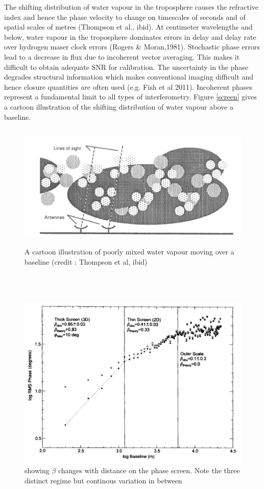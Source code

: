 The shifting distribution of water vapour in the troposphere causes the refractive index and hence the phase velocity to change on timescales of seconds and of spatial scales of metres (Thompson et al., ibid).  At centimeter wavelengths and below, water vapour in the troposphere dominates errors in delay and delay rate over hydrogen maser clock errors (Rogers \& Moran,1981). Stochastic phase errors lead to a decrease in flux due to incoherent vector averaging. This makes it difficult to obtain adequate SNR for calibration. The uncertainty in the phase degrades structural information which makes conventional imaging difficult and hence closure quantities are often used (e.g. Fish et al 2011). Incoherent phases represent a fundamental limit to all types of interferometry. 
Figure \ref{screen} gives a cartoon illustration of the shifting distribution of water vapour above a baseline. 
\begin{figure}[h!]
\centering
    \includegraphics[height=60mm,width=120mm]{Images/screen}
    \caption{A cartoon illustration of poorly mixed water vapour moving over a baseline (credit : Thompson et al, ibid) \label{phase:screen}}
\end{figure}
\\
~\\


\begin{figure}[h!]
\centering
    \includegraphics[scale=0.2]{Images/screentransition}
    \caption{showing $\beta$ changes with distance on the phase screen. Note the three distinct regime but continous variation in between}
\end{figure}

